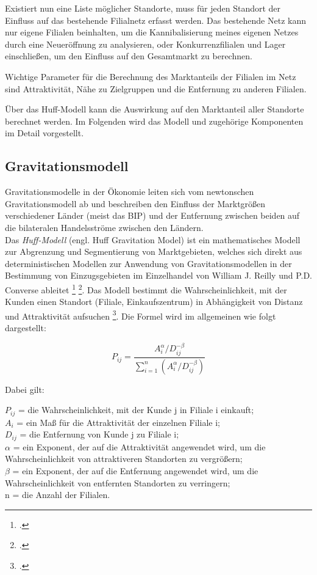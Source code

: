 Existiert nun eine Liste möglicher Standorte, muss für jeden Standort der Einfluss auf das bestehende Filialnetz erfasst werden.
Das bestehende Netz kann nur eigene Filialen beinhalten, um die Kannibalisierung meines eigenen Netzes durch eine Neueröffnung zu analysieren, oder Konkurrenzfilialen und Lager einschließen, um den Einfluss auf den Gesamtmarkt zu berechnen.

Wichtige Parameter für die Berechnung des Marktanteils der Filialen im Netz sind Attraktivität, Nähe zu Zielgruppen und die Entfernung zu anderen Filialen.

Über das Huff-Modell kann die Auswirkung auf den Marktanteil aller Standorte berechnet werden.
Im Folgenden wird das Modell und zugehörige Komponenten im Detail vorgestellt.

\subsection{Gravitationsmodell}
\label{subsec:gravitationmodel}
Gravitationsmodelle in der Ökonomie leiten sich vom newtonschen Gravitationsmodell ab und beschreiben den Einfluss der Marktgrößen verschiedener Länder (meist das BIP) und der Entfernung zwischen beiden auf die bilateralen Handelsströme zwischen den Ländern.\\
Das \textit{Huff-Modell} (engl. Huff Gravitation Model) ist ein mathematisches Modell zur Abgrenzung und Segmentierung von Marktgebieten, welches sich direkt aus deterministischen Modellen zur Anwendung von Gravitationsmodellen in der Bestimmung von Einzugsgebieten im Einzelhandel von William J. Reilly und P.D. Converse ableitet \footcite{reilly_law_1931} \footcite{converse_new_1949}.
Das Modell bestimmt die Wahrscheinlichkeit, mit der Kunden einen Standort (Filiale, Einkaufszentrum) in Abhängigkeit von Distanz und Attraktivität aufsuchen \footcite{arcgis_funktionsweise_huff}. 
Die Formel wird im allgemeinen wie folgt dargestellt:

\begin{equation}
	P_{i j}=\frac{A_{i}^{\alpha} / D_{i j}^{-\beta}}{\sum_{i=1}^{n}\left(A_{i}^{\alpha} / D_{i j}^{-\beta}\right)}
\end{equation}

Dabei gilt:

\( P_{i j} \) = die Wahrscheinlichkeit, mit der Kunde j in Filiale i einkauft;\\
\( A_{i} \) = ein Maß für die Attraktivität der einzelnen Filiale i;\\
\( D_{i j} \) = die Entfernung von Kunde j zu Filiale i;\\ 
\( \alpha \) = ein Exponent, der auf die Attraktivität angewendet wird, um die Wahrscheinlichkeit von attraktiveren Standorten zu vergrößern;\\ 
\( \beta \) = ein Exponent, der auf die Entfernung angewendet wird, um die Wahrscheinlichkeit von entfernten Standorten zu verringern;\\
n = die Anzahl der Filialen.

